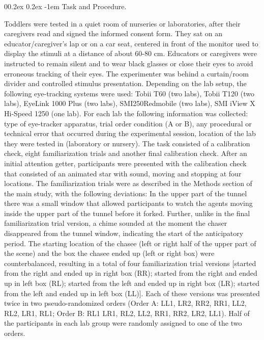 \documentclass[
  english,
  man, donotrepeattitle,floatsintext]{apa6}
\makeatletter
\let\oldparagraph\paragraph
\renewcommand{\paragraph}[1]{\oldparagraph{#1}\mbox{}}
\renewcommand{\paragraph}{\@startsection{paragraph}{4}{\parindent}%
  {0\baselineskip \@plus 0.2ex \@minus 0.2ex}%
  {-1em}%
  {\normalfont\normalsize\bfseries\itshape\typesectitle}}
\makeatother
\begin{document}
\hypertarget{task-and-procedure.}{%
\paragraph{Task and Procedure.}\label{task-and-procedure.}}

Toddlers were tested in a quiet room of nurseries or laboratories, after their caregivers read and signed the informed consent form. They sat on an educator/caregiver's lap or on a car seat, centered in front of the monitor used to display the stimuli at a distance of about 60-80 cm. Educators or caregivers were instructed to remain silent and to wear black glasses or close their eyes to avoid erroneous tracking of their eyes. The experimenter was behind a curtain/room divider and controlled stimulus presentation. Depending on the lab setup, the following eye-tracking systems were used: Tobii T60 (two labs), Tobii T120 (two labs), EyeLink 1000 Plus (two labs), SMI250Redmobile (two labs), SMI iView X Hi-Speed 1250 (one lab). For each lab the following information was collected: type of eye-tracker apparatus, trial order condition (A or B), any procedural or technical error that occurred during the experimental session, location of the lab they were tested in (laboratory or nursery).
The task consisted of a calibration check, eight familiarization trials and another final calibration check. After an initial attention getter, participants were presented with the calibration check that consisted of an animated star with sound, moving and stopping at four locations. The familiarization trials were as described in the Methods section of the main study, with the following deviations: In the upper part of the tunnel there was a small window that allowed participants to watch the agents moving inside the upper part of the tunnel before it forked. Further, unlike in the final familiarization trial version, a chime sounded at the moment the chaser disappeared from the tunnel window, indicating the start of the anticipatory period. The starting location of the chasee (left or right half of the upper part of the scene) and the box the chasee ended up (left or right box) were counterbalanced, resulting in a total of four familiarization trial versions {[}started from the right and ended up in right box (RR); started from the right and ended up in left box (RL); started from the left and ended up in right box (LR); started from the left and ended up in left box (LL){]}. Each of these versions was presented twice in two pseudo-randomized orders (Order A: LL1, LR2, RR2, RR1, LL2, RL2, LR1, RL1; Order B: RL1 LR1, RL2, LL2, RR1, RR2, LR2, LL1). Half of the participants in each lab group were randomly assigned to one of the two orders.
\end{document}
